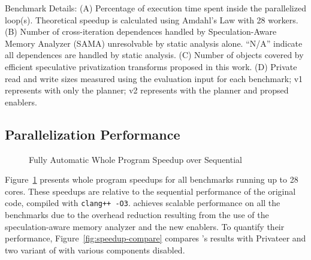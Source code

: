 \begin{table}[h]
  \centering
  
  \caption{
    Benchmark Details:
    (A) Percentage of
    execution time spent inside the parallelized loop(s). Theoretical speedup
    is calculated using Amdahl's Law with 28 workers.
    (B) Number of cross-iteration dependences
    handled by Speculation-Aware Memory Analyzer (SAMA) unresolvable by
    static analysis alone. ``N/A'' indicate all dependences are handled by static analysis.
    (C) Number of objects covered by efficient speculative
    privatization transforms proposed
    in this work.
    (D) Private read and write sizes measured using the
    evaluation input for each benchmark; v1 represents
    \name with only the planner; v2 represents \name with
    the planner and propsed enablers.}
  \label{tab:benchmark-list}
    \vspace{-5pt}
\end{table}

\subsection{Parallelization Performance}

\begin{figure}[ht]
  \centering
  \caption{Fully Automatic Whole Program Speedup over Sequential}
  \label{fig:multi-core-scale}
\end{figure}

Figure~\ref{fig:multi-core-scale} presents whole program speedups for
all benchmarks running up to 28 cores. These speedups are
relative to the sequential performance of the original code, compiled
with \texttt{clang++ -O3}. \name achieves scalable performance on all the
benchmarks due to the overhead reduction resulting from the use
of the speculation-aware memory analyzer and the new enablers.
To quantify their performance, Figure~\ref{fig:speedup-compare} compares
\namensp's results with Privateer and two variant of \name with various
components disabled.

